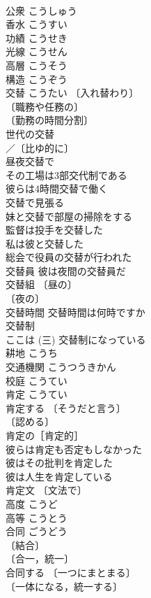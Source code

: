 \documentclass[8pt]{extreport}
\begin{document}
\begin{CJK}{UTF8}{min}
\\	公衆	こうしゅう	
\\	香水	こうすい	
\\	功績	こうせき	
\\	光線	こうせん	
\\	高層	こうそう	
\\	構造	こうぞう	
\\	交替	こうたい	〔入れ替わり〕
\\	〔職務や任務の〕
\\	〔勤務の時間分割〕
\\	世代の交替 
\\	／〔比ゆ的に〕
\\	昼夜交替で 
\\	その工場は3部交代制である 
\\	彼らは4時間交替で働く 
\\	交替で見張る 
\\	妹と交替で部屋の掃除をする 
\\	監督は投手を交替した 
\\	私は彼と交替した 
\\	総会で役員の交替が行われた 
\\	交替員 彼は夜間の交替員だ 
\\	交替組 〔昼の〕
\\	〔夜の〕
\\	交替時間 交替時間は何時ですか 
\\	交替制 
\\	ここは (三) 交替制になっている 
\\	耕地	こうち	
\\	交通機関	こうつうきかん	
\\	校庭	こうてい	
\\	肯定	こうてい	
\\	肯定する 〔そうだと言う〕
\\	〔認める〕
\\	肯定の［肯定的］ 
\\	彼らは肯定も否定もしなかった 
\\	彼はその批判を肯定した 
\\	彼は人生を肯定している 
\\	肯定文 〔文法で〕
\\	高度	こうど	
\\	高等	こうとう	
\\	合同	ごうどう	
\\	〔結合〕
\\	〔合一，統一〕
\\	合同する 〔一つにまとまる〕
\\	〔一体になる，統一する〕

\end{CJK}
\end{document}
